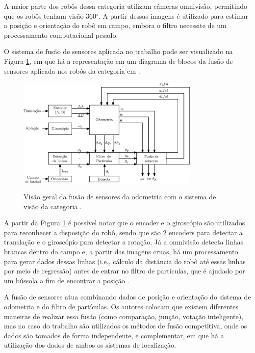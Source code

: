\documentclass[acronym, symbols, table]{fei}
\begin{document}
	A maior parte dos robôs dessa categoria utilizam câmeras omnivisão, permitindo que os robôs tenham visão 360$^\circ$. A partir dessas imagens é utilizado  para estimar a posição e orientação do robô em campo, embora o filtro necessite de um processamento computacional pesado.
	
	O sistema de fusão de sensores aplicada no trabalho pode ser visualizado na Figura \ref{fig:msl_sensor_fusion}, em que há a representação em um diagrama de blocos da fusão de sensores aplicada nos robôs da categoria  em \textcite{ismail2022soccer}.
	
	\begin{figure}[!htb]
		\centering
		\caption{Visão geral da fusão de sensores da odometria com o sistema de visão da categoria .} 
		\includegraphics[width=0.8\textwidth]{msl_sensor_fusion.eps}
		\label{fig:msl_sensor_fusion}
	\end{figure}
	
	A partir da Figura \ref{fig:msl_sensor_fusion} é possível notar que o encoder e o giroscópio são utilizados para reconhecer a disposição do robô, sendo que são 2 encoders para detectar a translação e o giroscópio para detectar a rotação. Já a omnivisão detecta linhas brancas dentro do campo e, a partir das imagens cruas, há um processamento para gerar dados dessas linhas (i.e., cálculo da distância do robô até essas linhas por meio de regressão) antes de entrar no filtro de partículas, que é ajudado por um bússola a fim de encontrar a posição .
	
	
	A fusão de sensores atua combinando dados de posição e orientação do sistema de odometria e do filtro de partículas. Os autores colocam que existem diferentes maneiras de realizar essa fusão (como comparação, junção, votação inteligente), mas no caso do trabalho são utilizados os métodos de fusão competitiva, onde os dados são tomados de forma independente, e complementar, em que há a utilização dos dados de ambos os sistemas de localização.
	
\end{document}
